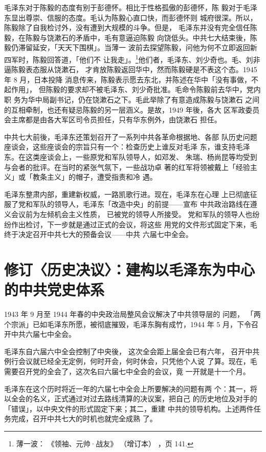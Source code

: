毛泽东对于陈毅的态度有别于彭德怀。相比于性格孤傲的彭德怀，陈
毅对于毛泽东显出尊崇、信服的态度。毛认为陈毅心直口快，而彭德怀则
城府很深。所以，陈毅除了自我检讨外，没有遭到大规模的斗争。但是，
毛泽东并没有完全信任陈毅，在陈毅与饶漱石的矛盾中，毛有意逼迫陈毅
向饶低头。中共七大结束後，陈毅仍滞留延安，「天天下围棋」。当薄一
波前去探望陈毅，问他为何不立即返回新四军时，陈毅回答道，「他们不
让我走」。\footnote{薄一波：
《领袖、元帅·战友》
（增订本）
，页 141.}他们者，毛泽东、刘少奇也。毛、刘非逼陈毅表态服从饶漱石，
才肯放陈毅返回华中，然而陈毅硬是不表这个态。1945 年 8 月，日本投降
消息传来，陈毅表示愿去东北，并陈述在华中「没有事做，不起作用」，
但陈毅的要求却不被毛泽东、刘少奇批准。毛命令陈毅前去华中，党内职
务为华中局副书记，仍在饶漱石之下。毛此举除了有意造成陈毅与饶漱石
之间的互相牵制，也还有疑忌陈毅的另一层涵义。是故，1949 年後，各大
区军政委员会主席都是由各大军区司令员担任，只有华东例外，由饶漱石
担任。

中共七大前後，毛泽东还策划召开了一系列中共各革命根据地、各部
队历史问题座谈会，这些座谈会的宗旨只有一个：检查历史上谁反对毛泽
东，谁支持毛泽东。在这类座谈会上，一些原党和军队领导人，如邓发、
朱瑞、杨尚昆等均受到与会者的批评。在当时的紧张气氛下，一些战功卓
著的红军将领被戴上「经验主义」或「教条主义」的帽子，遭受指责和冷
遇。

毛泽东整肃内部，重建新权威，一路凯歌行进。现在，毛泽东在心理
上已彻底征服了党和军队的领导人，毛泽东「改造中央」的前提——宣布
中共政治路线在遵义会议前为左倾机会主义性质，
已被党的领导人所接受。
党和军队的领导人也纷纷作出检讨，下一步就是通过正式的会议，将这些
用党的文件形式固定下来，毛终于决定召开中共七大的预备会议——中共
六届七中全会。

\section{修订〈历史决议〉：建构以毛泽东为中心的中共党史体系}

1943 年 9 月至 1944 年春的中央政治局整风会议解决了中共领导层的
问题，
「两个宗派」已如毛泽东所愿，被彻底摧毁，毛泽东胸有成竹，1944
年 5 月，下令召开中共六届七中全会。

毛泽东自六届六中全会控制了中央後，
这次全会距上届全会已有六年，
召开中共例行会议就已经全无定例，何时开会，何时休会，只凭他个人说
了算。现在，毛需要召开党的全会了，这次名曰六届七中全会的会议，竟
一开就是十一个月。

毛泽东在这个历时将近一年的六届七中全会上所要解决的问题有两
个：其一，将以全会的名义，正式通过对过去路线清算的决议案，把自己
的历史地位及对手的「错误」，以中央文件的形式固定下来；其二，重建
中共的领导机构。上述两件任务完成，召开中共七大的时机也就完全成熟
了。


